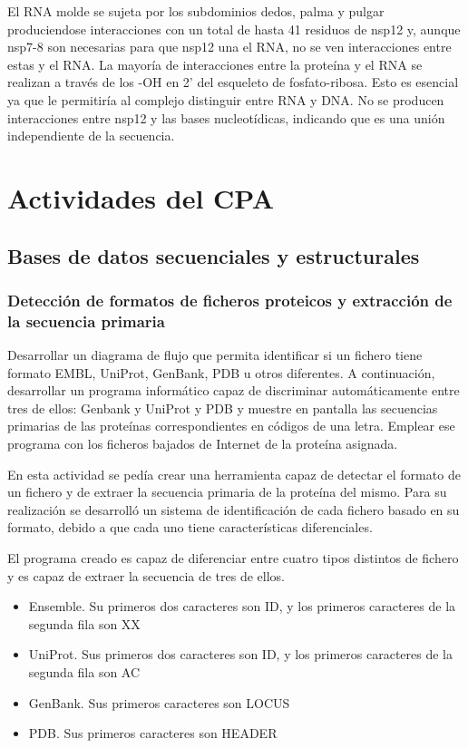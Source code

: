 \documentclass[a4paper,11pt]{report}
\begin{document}
El RNA molde se sujeta por los subdominios dedos, palma y pulgar produciendose interacciones con un total de hasta 41 residuos de nsp12 y, aunque nsp7-8 son necesarias para que nsp12 una el RNA, no se ven interacciones entre estas y el RNA. La mayoría de interacciones entre la proteína y el RNA se realizan a través de los -OH en 2' del esqueleto de fosfato-ribosa. Esto es esencial ya que le permitiría al complejo distinguir entre RNA y DNA. No se producen interacciones entre nsp12 y las bases nucleotídicas, indicando que es una unión independiente de la secuencia.



\cite{eRTC} 



 \chapter{Actividades del CPA}
 \section{Bases de datos secuenciales y estructurales}
 \subsection{Detección de formatos de ficheros proteicos y extracción de la secuencia primaria}
 Desarrollar un diagrama de flujo que permita identificar si un fichero tiene formato EMBL, UniProt, GenBank, PDB u otros  diferentes. A continuación, desarrollar un programa informático capaz de discriminar automáticamente entre tres de ellos: Genbank y UniProt y PDB y muestre en pantalla las secuencias primarias de las proteínas correspondientes en códigos de una letra. Emplear ese programa con los ficheros bajados de Internet de la proteína asignada.
 
 En esta actividad se pedía crear una herramienta capaz de detectar el formato de un fichero y de extraer la secuencia primaria de la proteína del mismo. Para su realización se desarrolló un sistema de identificación de cada fichero basado en su formato, debido a que cada uno tiene características diferenciales.
 
El programa creado es capaz de diferenciar entre cuatro tipos distintos de fichero y es capaz de extraer la secuencia de tres de ellos. 
\begin{itemize}
	\item Ensemble. Su primeros dos caracteres son ID, y los primeros caracteres de la segunda fila son XX
	\item UniProt. Sus primeros dos caracteres son ID, y los primeros caracteres de la segunda fila son AC
	\item GenBank. Sus primeros caracteres son LOCUS
	\item PDB. Sus primeros caracteres son HEADER	
\end{itemize}
\end{document}
